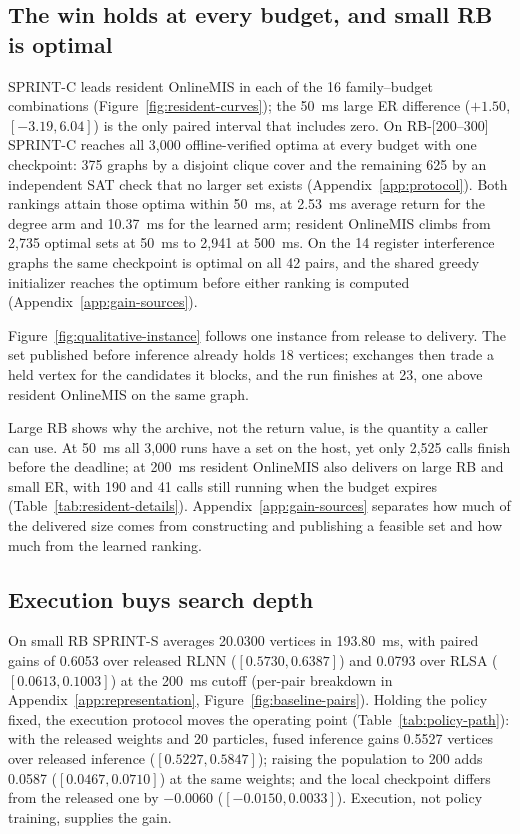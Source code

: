 \subsection{The win holds at every budget, and small RB is optimal}

SPRINT-C leads resident OnlineMIS in each of the 16 family--budget combinations (Figure~\ref{fig:resident-curves}); the 50~ms large ER difference ($+1.50$, $[-3.19,6.04]$) is the only paired interval that includes zero. On RB-[200--300] SPRINT-C reaches all 3,000 offline-verified optima at every budget with one checkpoint: 375 graphs by a disjoint clique cover and the remaining 625 by an independent SAT check that no larger set exists (Appendix~\ref{app:protocol}). Both rankings attain those optima within 50~ms, at 2.53~ms average return for the degree arm and 10.37~ms for the learned arm; resident OnlineMIS climbs from 2,735 optimal sets at 50~ms to 2,941 at 500~ms. On the 14 register interference graphs the same checkpoint is optimal on all 42 pairs, and the shared greedy initializer reaches the optimum before either ranking is computed (Appendix~\ref{app:gain-sources}).

Figure~\ref{fig:qualitative-instance} follows one instance from release to delivery. The set published before inference already holds 18 vertices; exchanges then trade a held vertex for the candidates it blocks, and the run finishes at 23, one above resident OnlineMIS on the same graph.

Large RB shows why the archive, not the return value, is the quantity a caller can use. At 50~ms all 3,000 runs have a set on the host, yet only 2,525 calls finish before the deadline; at 200~ms resident OnlineMIS also delivers on large RB and small ER, with 190 and 41 calls still running when the budget expires (Table~\ref{tab:resident-details}). Appendix~\ref{app:gain-sources} separates how much of the delivered size comes from constructing and publishing a feasible set and how much from the learned ranking.

\subsection{Execution buys search depth}
On small RB SPRINT-S averages 20.0300 vertices in 193.80~ms, with paired gains of 0.6053 over released RLNN ($[0.5730,0.6387]$) and 0.0793 over RLSA ($[0.0613,0.1003]$) at the 200~ms cutoff (per-pair breakdown in Appendix~\ref{app:representation}, Figure~\ref{fig:baseline-pairs}). Holding the policy fixed, the execution protocol moves the operating point (Table~\ref{tab:policy-path}): with the released weights and 20 particles, fused inference gains 0.5527 vertices over released inference ($[0.5227,0.5847]$); raising the population to 200 adds 0.0587 ($[0.0467,0.0710]$) at the same weights; and the local checkpoint differs from the released one by $-0.0060$ ($[-0.0150,0.0033]$). Execution, not policy training, supplies the gain.

